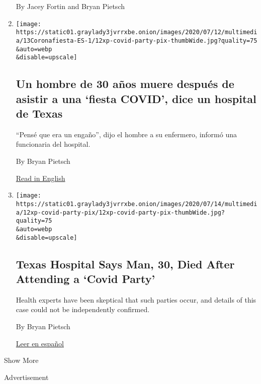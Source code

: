 \begin{enumerate}
  By Jacey Fortin and Bryan Pietsch
\item
  \href{/es/2020/07/13/espanol/mundo/fiesta-covid.html}{}

  \texttt{[image: https://static01.graylady3jvrrxbe.onion/images/2020/07/12/multimedia/13Coronafiesta-ES-1/12xp-covid-party-pix-thumbWide.jpg?quality=75\\\&auto=webp\\\&disable=upscale]}

  \hypertarget{un-hombre-de-30-auxf1os-muere-despuuxe9s-de-asistir-a-una-fiesta-covid-dice-un-hospital-de-texas}{%
  \subsection{Un hombre de 30 años muere después de asistir a una
  `fiesta COVID', dice un hospital de
  Texas}\label{un-hombre-de-30-auxf1os-muere-despuuxe9s-de-asistir-a-una-fiesta-covid-dice-un-hospital-de-texas}}

  ``Pensé que era un engaño'', dijo el hombre a su enfermero, informó
  una funcionaria del hospital.

  By Bryan Pietsch

  \href{https://www.nytimes3xbfgragh.onion/2020/07/12/us/30-year-old-covid-party-death.html}{Read
  in English}
\item
  \href{/2020/07/12/us/30-year-old-covid-party-death.html}{}

  \texttt{[image: https://static01.graylady3jvrrxbe.onion/images/2020/07/14/multimedia/12xp-covid-party-pix/12xp-covid-party-pix-thumbWide.jpg?quality=75\\\&auto=webp\\\&disable=upscale]}

  \hypertarget{texas-hospital-says-man-30-died-after-attending-a-covid-party}{%
  \subsection{Texas Hospital Says Man, 30, Died After Attending a `Covid
  Party'}\label{texas-hospital-says-man-30-died-after-attending-a-covid-party}}

  Health experts have been skeptical that such parties occur, and
  details of this case could not be independently confirmed.

  By Bryan Pietsch

  \href{https://www.nytimes3xbfgragh.onion/es/2020/07/13/espanol/mundo/fiesta-covid.html}{Leer
  en español}
\end{enumerate}

Show More

Advertisement

